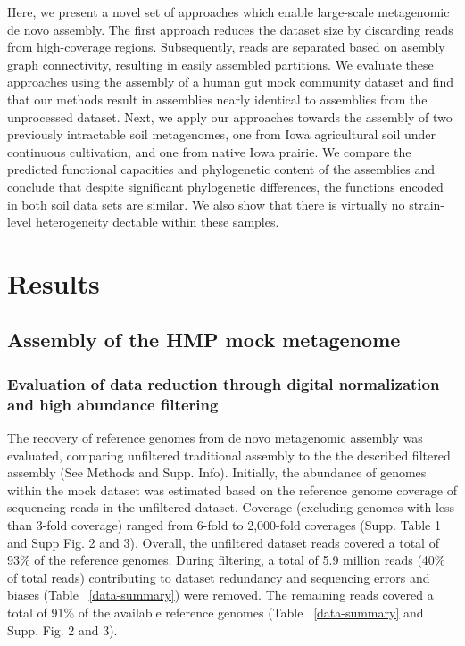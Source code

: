 \documentclass[11pt]{article} %
\begin{document}
Here, we present a novel set of approaches which enable large-scale
metagenomic de novo assembly.  The first approach reduces the dataset
size by discarding reads from high-coverage regions.  Subsequently,
reads are separated based on asembly graph connectivity, resulting in
easily assembled partitions.  We evaluate these approaches using the
assembly of a human gut mock community dataset and find that our
methods result in assemblies nearly identical to assemblies from the
unprocessed dataset.  Next, we apply our approaches towards the
assembly of two previously intractable soil metagenomes, one from Iowa
agricultural soil under continuous cultivation, and one from native
Iowa prairie.  We compare the predicted functional capacities and
phylogenetic content of the assemblies and conclude that despite
significant phylogenetic differences, the functions encoded in both
soil data sets are similar.  We also show that there is virtually no
strain-level heterogeneity dectable within these samples.

\section{Results}

\subsection{Assembly of the HMP mock metagenome}

\subsubsection{Evaluation of data reduction through digital normalization 
and high abundance filtering}

The recovery of reference genomes from de novo metagenomic assembly
was evaluated, comparing unfiltered traditional assembly to the the
described filtered assembly (See Methods and Supp. Info). Initially,
the abundance of genomes within the mock dataset was estimated based
on the reference genome coverage of sequencing reads in the unfiltered
dataset.  Coverage (excluding genomes with less than 3-fold coverage)
ranged from 6-fold to 2,000-fold coverages (Supp. Table
1 and Supp Fig. 2 and 3).  Overall, the unfiltered dataset reads covered a
total of 93\% of the reference genomes.  During filtering, a total of
5.9 million reads (40\% of total reads) contributing to dataset
redundancy and sequencing errors and biases (Table ~\ref{data-summary}) 
were removed.  The remaining reads covered a total of 91\% of the available 
reference genomes (Table ~\ref{data-summary} and Supp. Fig. 2 and 3).
\end{document}
